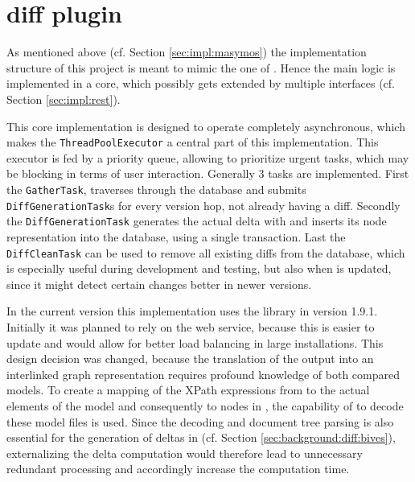 	\begin{comment}
	\begin{itemize}
		\item generic ontology import for COMODI
		\item some helper methods/functions
	\end{itemize}
	\end{comment}

\section{\masymos diff plugin}
	\label{sec:impl:diff}
	As mentioned above (cf. Section \ref{sec:impl:masymos}) the implementation structure of this project is meant to mimic the one of \masymos. Hence the main logic is implemented in a core, which possibly gets extended by multiple interfaces (cf. Section \ref{sec:impl:rest}).
	
	This core implementation is designed to operate completely asynchronous, which makes the \texttt{ThreadPoolExecutor} a central part of this implementation. This executor is fed by a priority queue, allowing to prioritize urgent tasks, which may be blocking in terms of user interaction.
	Generally 3 tasks are implemented. First the \texttt{GatherTask}, traverses through the database and submits \texttt{DiffGenerationTask}s for every version hop, not already having a diff.
	Secondly the \texttt{DiffGenerationTask} generates the actual delta with \bives and inserts its node representation into the database, using a single transaction.
	Last the \texttt{DiffCleanTask} can be used to remove all existing diffs from the database, which is especially useful during development and testing, but also when \bives is updated, since it might detect certain changes better in newer versions.
	
	In the current version this implementation uses the \bives library in version 1.9.1. Initially it was planned to rely on the \bives web service, because this is easier to update and would allow for better load balancing in large installations.
	This design decision was changed, because the translation of the \bives \xml output into an interlinked graph representation requires profound knowledge of both compared models. To create a mapping of the XPath expressions from \bives to the actual \xml elements of the model and consequently to nodes in \masymos, the capability of \bives to decode these model files is used. Since the decoding and document tree parsing is also essential for the generation of deltas in \bives (cf. Section \ref{sec:background:diff:bives}), externalizing the delta computation would therefore lead to unnecessary redundant processing and accordingly increase the computation time.
	
